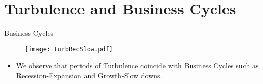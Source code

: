 \documentclass{beamer}
\newcommand*{\LargerCdot}{\raisebox{-0.25ex}{\scalebox{2.3}{$\cdot$}}}
\begin{document}


\section{Turbulence and Business Cycles}
\begin{frame}{Business Cycles}{}
		\vspace*{-0.3 in}
		\begin{figure}
			\scalebox{0.7}
			{\hspace*{-0.4in}\texttt{[image: turbRecSlow.pdf]}}
		\end{figure}
		\vspace*{-0.4 in}
		\begin{itemize}
			\item{We observe that periods of Turbulence coincide with Business Cycles such as Recession-Expansion and Growth-Slow downs.}
		\end{itemize}
\end{frame}
\end{document}
